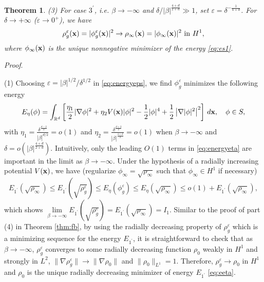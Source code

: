 \documentclass{elsarticle}
\newcommand{\vep}{\varepsilon}
\newcommand{\be}{\begin{equation}}
\newcommand{\ee}{\end{equation}}
\newtheorem{theorem}{Theorem}[section]
\newcommand{\bx}{{\bf x} }
\begin{document}
\begin{theorem}
(3) For case $3^\prime$, i.e. $\beta\to-\infty$ and $\delta/|\beta|^{\frac{4+d}{2+d}}\gg1$, set %
$\vep=\delta^{-\frac{1}{4+d}}$. For $\delta\to+\infty$ ($\vep\to 0^+$), we have
\be
\rho_g^\vep(\bx)=|\phi_g^\vep(\bx)|^2\rightarrow\rho_\infty(\bx)=|\phi_\infty(\bx)|^2 \text{ in } H^1,
\ee
where $\phi_\infty(\bx)$
is the unique nonnegative minimizer of the energy \eqref{eq:es1}.
\end{theorem}
{\noindent\it Proof}.

(1)  Choosing $\vep=|\beta|^{1/2}/\delta^{1/2}$ in \eqref{eq:energyeps}, we find $\phi_g^\vep$ minimizes the following energy
\begin{equation}\label{eq:energyeta}
E_\eta(\phi)=
\int_{\Bbb R^d}\left[\frac{\eta_1}{2}|\nabla\phi|^2+\eta_2V(\bx)|\phi|^2-\frac12|\phi|^4+\frac12\left|\nabla|\phi|^2\right|^2\right]\,d\bx,\quad \phi\in S,
\end{equation}
with $\eta_1=\frac{\delta^{\frac{d-2}{2}}}{|\beta|^{d/2}}=o(1)$ and $\eta_2=\frac{\delta^{\frac{d+2}{2}}}{|\beta|^{\frac{4+d}{2}}}=o(1)$ when $\beta\to-\infty$
and $\delta=o(|\beta|^{\frac{4+d}{2+d}})$. Intuitively, only the leading $O(1)$ terms in \eqref{eq:energyeta} are important in the limit as $\beta\to-\infty$.
Under the hypothesis of a radially  increasing potential $V(\bx)$, we have (regularize $\phi_\infty=\sqrt{\rho_\infty}$ such that $\phi_\infty\in H^1$ if necessary)
\be
E_{1^\prime}(\sqrt{\rho_\infty})\le E_{1^\prime}(\sqrt{\rho_g^\vep})\leq E_\eta(\phi_g^\vep)\leq E_\eta(\sqrt{\rho_\infty})\leq o(1)+E_{1^\prime}(\sqrt{\rho_\infty}),
\ee
which shows $\lim\limits_{\beta\to-\infty}E_{1^\prime}(\sqrt{\rho_g^\vep})=E_{1^\prime}(\sqrt{\rho_\infty})=I_1$.
Similar to the proof of part (4) in Theorem \ref{thm:fb}, by using the radially decreasing property of $\rho_g^\vep$ which is a minimizing sequence for the energy $E_{1^\prime}$, it is straightforward to check that
as $\beta\to-\infty$,  $\rho_g^\vep$ converges to some radially decreasing function $\rho_0$ weakly in $H^1$ and strongly in $L^2$, $\|\nabla\rho^\vep_g\|\to\|\nabla\rho_0\|$ and $\|\rho_0\|_{L^1}=1$. Therefore, $\rho_g^\vep\to \rho_0$ in $H^1$ and $\rho_0$ is the unique radially decreasing minimizer of energy $E_{1^\prime}$ \eqref{eq:eeta}.
\end{document}
